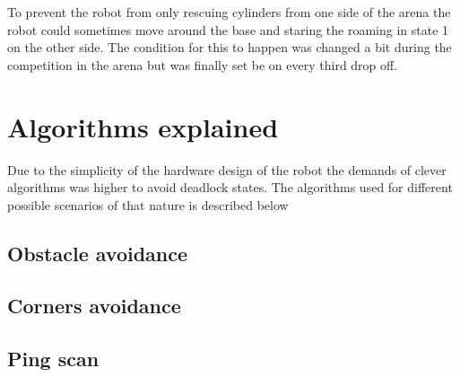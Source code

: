  To prevent the robot from only rescuing cylinders from one side of the arena the robot could sometimes move around the base and staring the roaming in state 1 on the other side. The condition for this to happen was changed a bit during the competition in the arena but was finally set be on every third drop off. 
 
 \section{Algorithms explained}
 
 Due to the simplicity of the hardware design of the robot the demands of clever algorithms was higher to avoid deadlock states. The algorithms used for different possible scenarios of that nature is described below
 
 \subsection{Obstacle avoidance}
 
 \subsection{Corners avoidance}
 
 \subsection{Ping scan}
